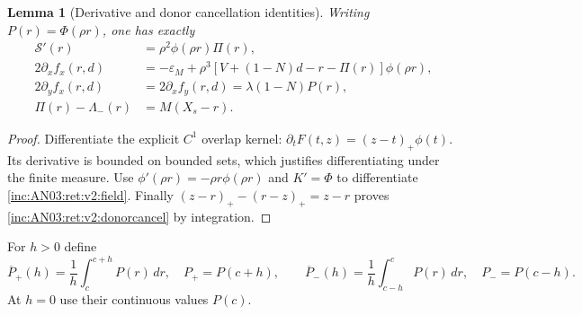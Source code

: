 \documentclass[11pt]{article}
\numberwithin{equation}{section}
\newtheorem{lemma}[theorem]{Lemma}
\theoremstyle{remark}\newtheorem{remark}[theorem]{Remark}
\newcommand{\dd}{\,d}
\newcommand{\1}{\mathbf 1}
\begin{document}
\begin{lemma}[Derivative and donor cancellation identities]
\label{inc:AN03:ret:v2:jacobian}
Writing $P(r)=\Phi(\rho r)$, one has exactly
\begin{align}
 \mathcal S'(r)&=\rho^2\phi(\rho r)\Pi(r),\nonumber\\
 2\partial_xf_x(r,d)&=-\varepsilon_M+
 \rho^3[V+(1-N)d-r-\Pi(r)]\phi(\rho r),\label{inc:AN03:ret:v2:dx}\\
 2\partial_yf_x(r,d)&=2\partial_xf_y(r,d)=\lambda(1-N)P(r),\nonumber\\
 \Pi(r)-\Lambda_-(r)&=M(X_s-r).\label{inc:AN03:ret:v2:donorcancel}
\end{align}
\end{lemma}
\begin{proof}
Differentiate the explicit $C^1$ overlap kernel:
$\partial_tF(t,z)=(z-t)_+\phi(t)$.
Its derivative is bounded on bounded sets, which justifies differentiating
under the finite measure. Use $\phi'(\rho r)=-\rho r\phi(\rho r)$
and $K'=\Phi$ to differentiate \eqref{inc:AN03:ret:v2:field}.
Finally $(z-r)_+-(r-z)_+=z-r$ proves
\eqref{inc:AN03:ret:v2:donorcancel} by integration.
\end{proof}

For $h>0$ define
\[
 \overline P_+(h)=\frac1h\int_c^{c+h}P(r)\dd r,
 \quad P_+=P(c+h),\qquad
 \overline P_-(h)=\frac1h\int_{c-h}^{c}P(r)\dd r,
 \quad P_-=P(c-h).
\]
At $h=0$ use their continuous values $P(c)$.
\end{document}
